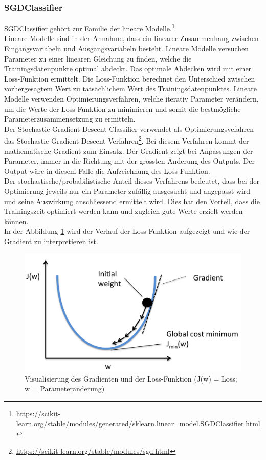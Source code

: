 \subsubsection{SGDClassifier}
SGDClassifier gehört zur Familie der lineare Modelle.\footnote{\url{https://scikit-learn.org/stable/modules/generated/sklearn.linear_model.SGDClassifier.html}}\\
Lineare Modelle sind in der Annahme, dass ein linearer Zusammenhang zwischen Eingangsvariabeln und Ausgangsvariabeln besteht.
Lineare Modelle versuchen Parameter zu einer linearen Gleichung zu finden, welche die Trainingsdatenpunkte optimal abdeckt.
Das optimale Abdecken wird mit einer Loss-Funktion ermittelt.
Die Loss-Funktion berechnet den Unterschied zwischen vorhergesagtem Wert zu tatsächlichem Wert des Trainingsdatenpunktes.
Lineare Modelle verwenden Optimierungsverfahren, welche iterativ Parameter verändern, um die Werte der Loss-Funktion zu minimieren und somit die bestmögliche Parameterzusammensetzung zu ermitteln.\\
Der \glqq Stochastic-Gradient-Descent-Classifier\grqq{} verwendet als Optimierungsvefahren das \glqq Stochastic Gradient Descent\grqq{} Verfahren\footnote{\url{https://scikit-learn.org/stable/modules/sgd.html}}.
Bei diesem Verfahren kommt der mathematische Gradient zum Einsatz.
Der Gradient zeigt bei Anpassungen der Parameter, immer in die Richtung mit der grössten Änderung des Outputs.
Der Output wäre in diesem Falle die Aufzeichnung des Loss-Funktion.\\
Der stochastische/probabilistische Anteil dieses Verfahrens bedeutet, dass bei der Optimierung jeweils nur ein Parameter zufällig ausgesucht und angepasst wird und seine Auswirkung anschliessend ermittelt wird.
Dies hat den Vorteil, dass die Trainingszeit optimiert werden kann und zugleich gute Werte erzielt werden können.\\
In der Abbildung \cref{fig:sgd} wird der Verlauf der Loss-Funktion aufgezeigt und wie der Gradient zu interpretieren ist.
\begin{figure}[H]	
	\includegraphics[width=1\columnwidth,keepaspectratio]{img/sgd.png}
	\caption{Visualisierung des Gradienten und der Loss-Funktion (J(w) = Loss; w = Parameteränderung)}
	\label{fig:sgd}
\end{figure}

